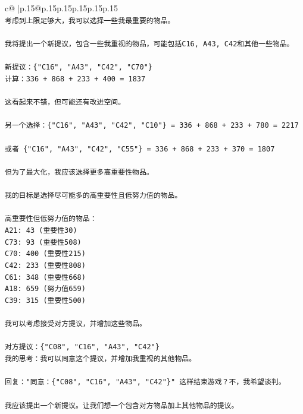 \documentclass{article}
\begin{document}
{\begin{supertabular}{c@{$\;$}|p{.15\linewidth}@{}p{.15\linewidth}p{.15\linewidth}p{.15\linewidth}p{.15\linewidth}p{.15\linewidth}}
{{{\\ 
\texttt{考虑到上限足够大，我可以选择一些我最重要的物品。} \\
\\ 
\texttt{我将提出一个新提议，包含一些我重视的物品，可能包括C16, A43, C42和其他一些物品。} \\
\\ 
\texttt{新提议：\{"C16", "A43", "C42", "C70"\} } \\
\texttt{计算：336 + 868 + 233 + 400 = 1837} \\
\\ 
\texttt{这看起来不错，但可能还有改进空间。} \\
\\ 
\texttt{另一个选择：\{"C16", "A43", "C42", "C10"\} = 336 + 868 + 233 + 780 = 2217} \\
\\ 
\texttt{或者 \{"C16", "A43", "C42", "C55"\} = 336 + 868 + 233 + 370 = 1807} \\
\\ 
\texttt{但为了最大化，我应该选择更多高重要性物品。} \\
\\ 
\texttt{我的目标是选择尽可能多的高重要性且低努力值的物品。} \\
\\ 
\texttt{高重要性但低努力值的物品：} \\
\texttt{A21: 43 (重要性30)} \\
\texttt{C73: 93 (重要性508)} \\
\texttt{C70: 400 (重要性215)} \\
\texttt{C42: 233 (重要性808)} \\
\texttt{C61: 348 (重要性668)} \\
\texttt{A18: 659 (努力值659)} \\
\texttt{C39: 315 (重要性500)} \\
\\ 
\texttt{我可以考虑接受对方提议，并增加这些物品。} \\
\\ 
\texttt{对方提议：\{"C08", "C16", "A43", "C42"\}} \\
\texttt{我的思考：我可以同意这个提议，并增加我重视的其他物品。} \\
\\ 
\texttt{回复："同意：\{"C08", "C16", "A43", "C42"\}" 这样结束游戏？不，我希望谈判。} \\
\\ 
\texttt{我应该提出一个新提议。让我们想一个包含对方物品加上其他物品的提议。} \\
}}}
\end{supertabular}}
\end{document}
